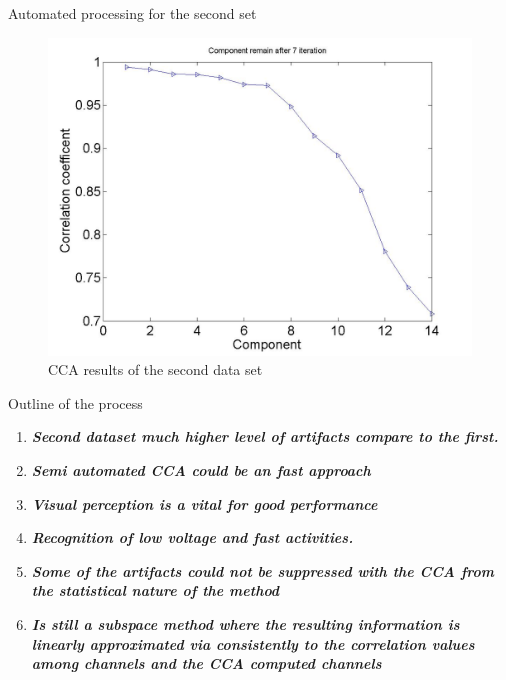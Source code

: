 \documentclass[t,12pt,english
\ifx\beamermode\undefined\else,\beamermode\fi
]{beamer}
\begin{document}
\begin{frame}{Automated processing for the second set }
\begin{figure}[!htbp]
\includegraphics[width=.8\textwidth]{26.jpg}\\
\tiny{CCA results of the second data set}\label{toda2}
\endminipage\hfill
\end{figure}    
    
\end{frame}      
    
    
\begin{frame}{Outline of the process}

\begin{block}{\footnotesize{}}\tiny{}
\begin{enumerate} 
\vspace{0.05cm}
     \item \tiny{\textbf{\textit{Second dataset much higher level of artifacts compare to the first.}}}
     \item \tiny{\textbf{\textit{Semi automated CCA could be an fast approach}}}
     \item \tiny{\textbf{\textit{Visual perception is a vital for good performance}}}
     \item \tiny{\textbf{\textit{Recognition of low voltage and fast activities.}}}
     \item \tiny{\textbf{\textit{Some of the artifacts could not be suppressed with the CCA from the statistical nature of the method}}}
     \item \tiny{\textbf{\textit{Is still a subspace method where the resulting information is linearly approximated via consistently to the correlation values among channels and the CCA computed channels}}} 

     
\end{enumerate}
\end{block}

     
   
\end{frame} 
    
\end{document}
